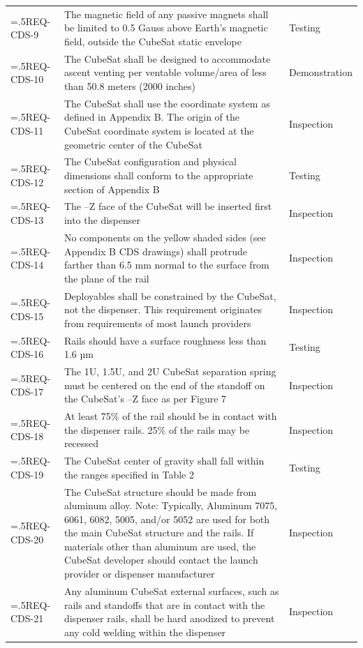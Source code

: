\begin{tabularx}{\columnwidth}{
    >{\hsize=.5\hsize \arraybackslash}X
    >{\hsize=1.5\hsize \arraybackslash}X
    >{\centering\arraybackslash}X}
    REQ-CDS-9 & The magnetic field of any passive magnets shall be limited to 0.5 Gauss above Earth’s magnetic field, outside the CubeSat static envelope & Testing \\
    REQ-CDS-10 & The CubeSat shall be designed to accommodate ascent venting per ventable volume/area of less than 50.8 meters (2000 inches) & Demonstration \\
    REQ-CDS-11 & The CubeSat shall use the coordinate system as defined in Appendix B. The origin of the CubeSat coordinate system is located at the geometric center of the CubeSat & Inspection \\
    REQ-CDS-12 & The CubeSat configuration and physical dimensions shall conform to the appropriate section of Appendix B & Testing \\
    REQ-CDS-13 & The –Z face of the CubeSat will be inserted first into the dispenser & Inspection \\
    REQ-CDS-14 & No components on the yellow shaded sides (see Appendix B \ac{CDS} drawings) shall protrude farther than 6.5 mm normal to the surface from the plane of the rail & Inspection \\
    REQ-CDS-15 & Deployables shall be constrained by the CubeSat, not the dispenser. This requirement originates from requirements of most launch providers & Inspection \\
    REQ-CDS-16 & Rails should have a surface roughness less than 1.6 µm & Testing \\
    REQ-CDS-17 & The 1U, 1.5U, and 2U CubeSat separation spring must be centered on the end of the standoff on the CubeSat’s –Z face as per Figure 7 & Inspection \\
    REQ-CDS-18 & At least 75\% of the rail should be in contact with the dispenser rails. 25\% of the rails may be recessed & Inspection \\
    REQ-CDS-19 & The CubeSat center of gravity shall fall within the ranges specified in Table 2 & Testing \\
    REQ-CDS-20 & The CubeSat structure should be made from aluminum alloy. Note: Typically, Aluminum 7075, 6061, 6082, 5005, and/or 5052 are used for both the main CubeSat structure and the rails. If materials other than aluminum are used, the CubeSat developer should contact the launch provider or dispenser manufacturer & Inspection \\
    REQ-CDS-21 & Any aluminum CubeSat external surfaces, such as rails and standoffs that are in contact with the dispenser rails, shall be hard anodized to prevent any cold welding within the dispenser & Inspection \\

\end{tabularx}
